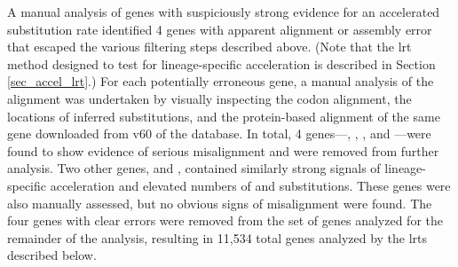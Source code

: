 A manual analysis of genes with suspiciously strong evidence for an
accelerated \nsyn substitution rate identified 4 genes with apparent
alignment or assembly error that escaped the various filtering steps
described above. (Note that the \ac{lrt} method designed to test for
lineage-specific acceleration is described in Section
\ref{sec_accel_lrt}.) For each potentially erroneous gene, a manual
analysis of the alignment was undertaken by visually inspecting the
codon alignment, the locations of inferred substitutions, and the
protein-based alignment of the same gene downloaded from v60 of the
\ens \cmp database. In total, 4 genes---, ,
, and ---were found to show evidence of serious
misalignment and were removed from further analysis. Two other genes,
 and , contained similarly strong signals
of lineage-specific acceleration and elevated numbers of \nsyn and
\syn substitutions. These genes were also manually assessed, but no
obvious signs of misalignment were found. The four genes with clear
errors were removed from the set of genes analyzed for the remainder
of the analysis, resulting in 11,534 total genes analyzed by the
\acp{lrt} described below.




